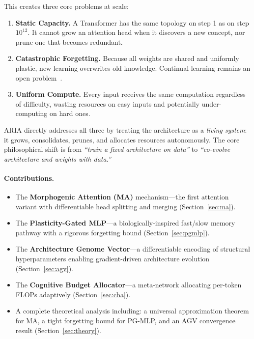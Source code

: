 \documentclass[11pt,a4paper]{article}
\theoremstyle{plain}
\theoremstyle{definition}
\theoremstyle{remark}
\begin{document}
This creates three core problems at scale:

\begin{enumerate}
  \item \textbf{Static Capacity.} A Transformer has the same topology on step 1 as on step $10^{12}$. It cannot grow an attention head when it discovers a new concept, nor prune one that becomes redundant.

  \item \textbf{Catastrophic Forgetting.} Because all weights are shared and uniformly plastic, new learning overwrites old knowledge. Continual learning remains an open problem~\citep{kirkpatrick2017, lopezpaz2017}.

  \item \textbf{Uniform Compute.} Every input receives the same computation regardless of difficulty, wasting resources on easy inputs and potentially under-computing on hard ones.
\end{enumerate}

ARIA directly addresses all three by treating the architecture as a \emph{living system}: it grows, consolidates, prunes, and allocates resources autonomously. The core philosophical shift is from \emph{``train a fixed architecture on data''} to \emph{``co-evolve architecture and weights with data.''}

\paragraph{Contributions.}
\begin{itemize}
  \item The \textbf{Morphogenic Attention (MA)} mechanism---the first attention variant with differentiable head splitting and merging (Section~\ref{sec:ma}).
  \item The \textbf{Plasticity-Gated MLP}---a biologically-inspired fast/slow memory pathway with a rigorous forgetting bound (Section~\ref{sec:pgmlp}).
  \item The \textbf{Architecture Genome Vector}---a differentiable encoding of structural hyperparameters enabling gradient-driven architecture evolution (Section~\ref{sec:agv}).
  \item The \textbf{Cognitive Budget Allocator}---a meta-network allocating per-token FLOPs adaptively (Section~\ref{sec:cba}).
  \item A complete theoretical analysis including: a universal approximation theorem for MA, a tight forgetting bound for PG-MLP, and an AGV convergence result (Section~\ref{sec:theory}).
\end{itemize}
\end{document}
